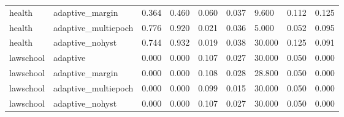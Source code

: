 \begin{table}[!t]
{\begin{tabular}{lllllllll}
health & adaptive\_margin & 0.364 & 0.460 & 0.060 & 0.037 & 9.600 & 0.112 & 0.125 \\
health & adaptive\_multiepoch & 0.776 & 0.920 & 0.021 & 0.036 & 5.000 & 0.052 & 0.095 \\
health & adaptive\_nohyst & 0.744 & 0.932 & 0.019 & 0.038 & 30.000 & 0.125 & 0.091 \\
lawschool & adaptive & 0.000 & 0.000 & 0.107 & 0.027 & 30.000 & 0.050 & 0.000 \\
lawschool & adaptive\_margin & 0.000 & 0.000 & 0.108 & 0.028 & 28.800 & 0.050 & 0.000 \\
lawschool & adaptive\_multiepoch & 0.000 & 0.000 & 0.099 & 0.015 & 30.000 & 0.050 & 0.000 \\
lawschool & adaptive\_nohyst & 0.000 & 0.000 & 0.107 & 0.027 & 30.000 & 0.050 & 0.000 \\
\hline
\end{tabular}
}
\end{table}
